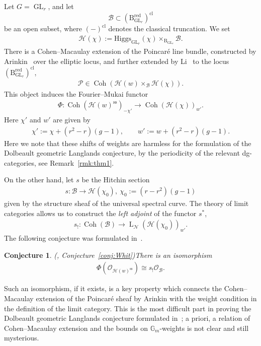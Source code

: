 \documentclass[11pt,oneside,a4paper,mathscr]{amsart}
\newtheorem{conj}[thm]{Conjecture}
\theoremstyle{definition}
\newcommand{\LL}{\operatorname{L}}
\newcommand{\cH}{\mathcal{H}}
\newcommand{\cB}{\mathcal{B}}
\newcommand{\cP}{\mathcal{P}}
\newcommand{\cO}{\mathcal{O}}
\newcommand{\rB}{\mathrm{B}}
\newcommand{\Coh}{\operatorname{Coh}}
\newcommand{\GL}{\operatorname{GL}}
\newcommand{\Hig}{\mathrm{Higgs}}
\begin{document}
Let $G=\GL_r$, and let
\[
    \cB \subset (\rB_{\GL_r}^{\mathrm{red}})^{\mathrm{cl}}
\]
be an open subset, where $(-)^{\mathrm{cl}}$ denotes the classical truncation.
We set
\begin{align*}
    \cH(\chi):=\Hig_{\GL_r}(\chi)\times_{\rB_{\GL_r}} \cB.
\end{align*}
There is a Cohen--Macaulay extension of the Poincar\'e line bundle, constructed by Arinkin~\cite{Ardual}
over the elliptic locus, and further extended by Li~\cite{MLi} to the locus
$(\rB_{\GL_r}^{\mathrm{red}})^{\mathrm{cl}}$,
\begin{align}\label{intro:Arsheaf}
    \cP \in \Coh(\cH(w)\times_{\cB}\cH(\chi)).
\end{align}
This object induces the Fourier--Mukai functor
\begin{align}\label{intro:Phi}
    \Phi \colon \Coh(\cH(w)^{\mathrm{ss}})_{-\chi'} \to
    \Coh(\cH(\chi))_{w'}.
\end{align}
Here $\chi'$ and $w'$ are given by
\begin{align*}
    \chi' := \chi+(r^2-r)(g-1), \qquad
    w' := w+(r^2-r)(g-1).
\end{align*}
Here we note that these shifts of weights are harmless for the formulation of the Dolbeault geometric Langlands conjecture, by the periodicity of the relevant dg-categories, see Remark~\ref{rmk:thm1}.

On the other hand, let $s$ be the Hitchin section
\begin{align*}
    s\colon \cB \to \cH(\chi_0), \ \chi_0:=(r-r^2)(g-1)
\end{align*}
given by the structure sheaf of the universal spectral curve.
The theory of limit categories allows us to construct the
\textit{left adjoint} of the functor $s^*$,
\begin{align*}
    s_{!} \colon \Coh(\cB) \to \LL_{\mathcal{N}}(\cH(\chi_0))_{w'}.
\end{align*}
The following conjecture was formulated in~\cite[Conjecture~4.4]{TodaGL2}.

\begin{conj}\emph{(\cite[Conjecture~4.4]{TodaGL2}, Conjecture~\ref{conj:Whit})}\label{intro:conj:whit}
There is an isomorphism
\begin{align}\label{intro:whit:isom}
    \Phi(\cO_{\cH(w)^{\mathrm{ss}}}) \cong s_{!}\cO_{\cB}.
\end{align}
\end{conj}

Such an isomorphism, if it exists, is a key property which connects the
Cohen--Macaulay extension of the Poincar\'e sheaf by Arinkin with the
weight condition in the definition of the limit category. This is the most
difficult part in proving the Dolbeault geometric Langlands conjecture
formulated in~\cite{PTlim}; a priori, a relation of 
Cohen--Macaulay extension and the bounds on $\mathbb{G}_m$-weights is not clear and still mysterious.
\end{document}
